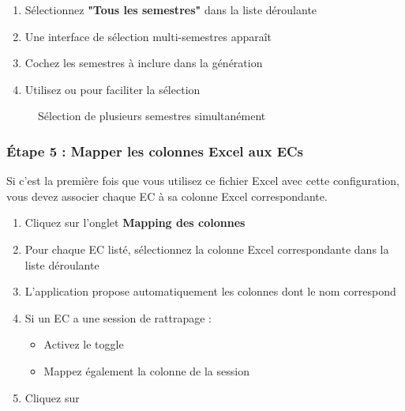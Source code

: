 \begin{enumerate}[leftmargin=*]
    \item Sélectionnez \textbf{"Tous les semestres"} dans la liste déroulante
    \item Une interface de sélection multi-semestres apparaît
    \item Cochez les semestres à inclure dans la génération
    \item Utilisez  ou  pour faciliter la sélection
\end{enumerate}

\begin{figure}[h]
    \centering
    \caption{Sélection de plusieurs semestres simultanément}
\end{figure}

\subsubsection{Étape 5 : Mapper les colonnes Excel aux ECs}

Si c'est la première fois que vous utilisez ce fichier Excel avec cette configuration, vous devez associer chaque EC à sa colonne Excel correspondante.

\begin{enumerate}[leftmargin=*]
    \item Cliquez sur l'onglet \textbf{Mapping des colonnes}
    \item Pour chaque EC listé, sélectionnez la colonne Excel correspondante dans la liste déroulante
    \item L'application propose automatiquement les colonnes dont le nom correspond
    \item Si un EC a une session de rattrapage :
    \begin{itemize}
        \item Activez le toggle 
        \item Mappez également la colonne de la session
    \end{itemize}
    \item Cliquez sur 
\end{enumerate}

